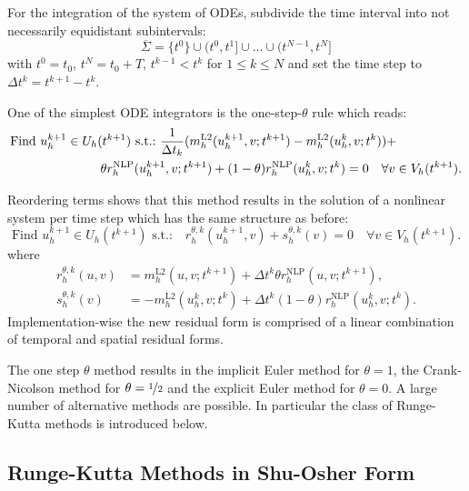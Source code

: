 \documentclass[a4paper,12pt]{article}
\begin{document}
For the integration of the system of ODEs, subdivide the time interval into
not necessarily equidistant subintervals:
\begin{equation*}
\overline{\Sigma} = \{t^{0}\} \cup (t^0,t^1] \cup \ldots \cup (t^{N-1},t^N]
\end{equation*}
with $t^0=t_0$, $t^N=t_0+T$, $t^{k-1}<t^k$ for $1\leq k\leq N$ and
set  the time step to $\Delta t^k=t^{k+1}-t^k$.

One of the simplest ODE integrators is 
the one-step-$\theta$ rule which reads:
\begin{equation}
\label{Eq:InstationaryProblem}
\begin{split}
&\text{Find $u_h^{k+1}\in U_h(t^{k+1})$ s.t.:} 
\ \frac{1}{\Delta t_k}(m_h^\text{L2}(u_h^{k+1},v;t^{k+1})-m_h^\text{L2}(u_h^{k},v;t^{k})) + \\
&\hspace{25mm}\theta r_h^\text{NLP}(u_h^{k+1},v;t^{k+1}) + (1-\theta) r_h^\text{NLP}(u_h^{k},v;t^{k}) = 0 
\quad \forall v\in V_h(t^{k+1}).
\end{split}
\end{equation}

Reordering terms shows that this method results in the solution
of a nonlinear system per time step which has the same structure as before:
\begin{equation*}
\text{Find $u_h^{k+1}\in U_h(t^{k+1})$ s.t.:} 
\quad r_h^{\theta,k} (u_h^{k+1},v) + s_h^{\theta,k}(v) = 0 
\quad \forall v\in V_h(t^{k+1}).
\end{equation*}
where
\begin{align*}
r^{\theta,k}_h(u,v) &= m_h^\text{L2}(u,v;t^{k+1})+\Delta t^k \theta r_h^\text{NLP}(u,v;t^{k+1}) ,\\
s^{\theta,k}_h(v) &= -m_h^\text{L2}(u^k_h,v;t^k) + \Delta t^k (1-\theta) r_h^\text{NLP}(u_h^k,v;t^k) . 
\end{align*}
Implementation-wise the new residual form is comprised of a linear combination
of temporal and spatial residual forms. 

The one step $\theta$ method results in the implicit Euler method for $\theta=1$,
the Crank-Nicolson method for $\theta=\nicefrac12$ and the explicit Euler method for $\theta=0$.
A large number of alternative methods are possible. In particular the class of 
Runge-Kutta methods is introduced below.

\subsection*{Runge-Kutta Methods in Shu-Osher Form}
\end{document}
